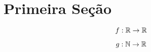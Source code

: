 \section{Primeira Seção}

\begin{equation}
	f : \mathbb{R} \rightarrow \mathbb{R}
\end{equation}

\begin{equation}
	g : \mathbb{N} \rightarrow \mathbb{R}
\end{equation}
